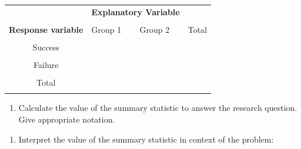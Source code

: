 \documentclass[
]{report}
\providecommand{\tightlist}{%
  \setlength{\itemsep}{0pt}\setlength{\parskip}{0pt}}
\begin{document}
\begingroup
\setlength{\tabcolsep}{14pt}
\renewcommand{\arraystretch}{2}
\begin{center}
\begin{tabular}{|c|p{1in}|p{1in}|p{1in}|}
\hline
 & \multicolumn{2}{|c|}{\textbf{Explanatory Variable}} & \\ 
 & \multicolumn{2}{|c|}{ } & \\ \hline
\textbf{Response variable} & Group 1 & Group 2 & Total \\
 & & & \\ \hline
 Success & & & \\
 & & & \\ \hline
 Failure & & & \\
 & & & \\ \hline
 Total & & & \\
 & & & \\ \hline
\end{tabular}
\end{center}
\endgroup

\begin{enumerate}
\def\labelenumi{\alph{enumi}.}
\setcounter{enumi}{4}
\tightlist
\item
  Calculate the value of the summary statistic to answer the research question. Give appropriate notation.
\end{enumerate}

\vspace{0.4in}

\begin{enumerate}
\def\labelenumi{\alph{enumi}.}
\setcounter{enumi}{5}
\tightlist
\item
  Interpret the value of the summary statistic in context of the problem:
\end{enumerate}

\vspace{0.3in}
\end{document}
